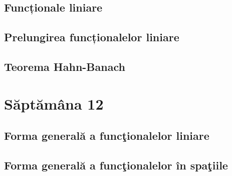 \documentclass[a4paper,12pt]{article}
\theoremstyle{change}
\begin{document}
\subsection{Funcționale liniare}


\subsection{Prelungirea funcționalelor liniare}

\subsection{Teorema Hahn-Banach}

\section{Săptămâna 12}


\subsection{Forma generală a funcţionalelor liniare}


\subsection{Forma generală a funcţionalelor în spaţiile }
\end{document}

